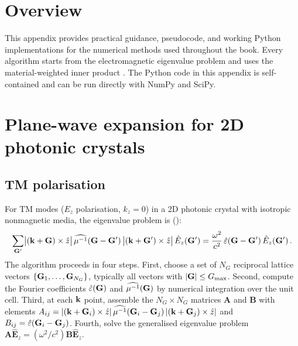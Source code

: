 
\section{Overview}
\label{sec:appC-overview}

This appendix provides practical guidance, pseudocode, and working Python
implementations for the numerical methods used throughout the book.
Every algorithm starts from the electromagnetic eigenvalue problem and
uses the material-weighted inner product
\cite{gangaraj2016berry,ozawa2018topological}.  The Python code in this
appendix is self-contained and can be run directly with NumPy and SciPy.

\section{Plane-wave expansion for 2D photonic crystals} \cite{wu2015scheme}
\label{sec:appC-pwe}

\subsection{TM polarisation}
\label{sec:appC-tm}

For TM modes ($E_z$ polarisation, $k_z=0$) in a 2D photonic crystal
with isotropic nonmagnetic media, the eigenvalue problem is
():
\begin{equation}\label{eq:appC-tm-evp}
  \sum_{\mathbf{G}'}\bigl|(\mathbf{k}+\mathbf{G})\times\hat{z}\bigr|\,
  \widehat{\mu^{-1}}(\mathbf{G}-\mathbf{G}')\,
  \bigl|(\mathbf{k}+\mathbf{G}')\times\hat{z}\bigr|\,
  \hat{E}_z(\mathbf{G}')
  = \frac{\omega^2}{c^2}\,\hat\varepsilon(\mathbf{G}-\mathbf{G}')\,
  \hat{E}_z(\mathbf{G}')\,.
\end{equation}
The algorithm proceeds in four steps.  First, choose a set of $N_G$
reciprocal lattice vectors $\{\mathbf{G}_1,\ldots,\mathbf{G}_{N_G}\}$, typically
all vectors with $|\mathbf{G}|\leq G_{\max}$.  Second, compute the Fourier
coefficients $\hat\varepsilon(\mathbf{G})$ and $\widehat{\mu^{-1}}(\mathbf{G})$
by numerical integration over the unit cell.  Third, at each $\mathbf{k}$
point, assemble the $N_G\times N_G$ matrices $\mathbf{A}$ and
$\mathbf{B}$ with elements
$A_{ij}=|(\mathbf{k}+\mathbf{G}_i)\times\hat{z}|\,
\widehat{\mu^{-1}}(\mathbf{G}_i-\mathbf{G}_j)\,|(\mathbf{k}+\mathbf{G}_j)\times\hat{z}|$
and $B_{ij}=\hat\varepsilon(\mathbf{G}_i-\mathbf{G}_j)$.  Fourth, solve the
generalised eigenvalue problem
$\mathbf{A}\hat{\mathbf{E}}_z=(\omega^2/c^2)\mathbf{B}\hat{\mathbf{E}}_z$.

